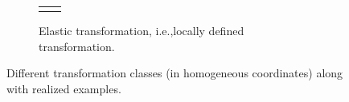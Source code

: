 \begin{figure}[!htbp]
\begin{subfigure}{\linewidth}
\begin{tabular}{>{\centering}p{4cm}c}
{{				}
			}
			\)
		\end{tabular}
		\caption{Elastic transformation, i.e.,locally defined transformation.} \label{fig:elastictransformation}
	\end{subfigure}
	\caption[Compact Routing Example]{Different transformation classes (in homogeneous coordinates) along with realized examples.}
	\label{fig:transformations}
\end{figure}
